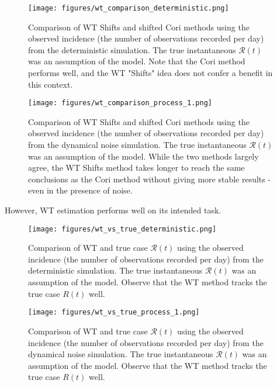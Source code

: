 \documentclass{article}
\newcommand{\nR}{\mathcal{R}}
\begin{document}
\begin{figure}[h!]
    \centering
    \texttt{[image: figures/wt\_comparison\_deterministic.png]}
    \caption{Comparison of WT Shifts and shifted Cori methods using the observed incidence (the number of observations recorded per day) from the deterministic simulation. The true instantaneous $\nR(t)$ was an assumption of the model. Note that the Cori method performs well, and the WT "Shifts" idea does not confer a benefit in this context.}
\end{figure}

\begin{figure}[h!]
    \centering
    \texttt{[image: figures/wt\_comparison\_process\_1.png]}
    \caption{Comparison of WT Shifts and shifted Cori methods using the observed incidence (the number of observations recorded per day) from the dynamical noise simulation. The true instantaneous $\nR(t)$ was an assumption of the model. While the two methods largely agree, the WT Shifts method takes longer to reach the same conclusions as the Cori method without giving more stable results - even in the presence of noise.}
\end{figure}

\clearpage
However, WT estimation performs well on its intended task.

\begin{figure}[h!]
    \centering
    \texttt{[image: figures/wt\_vs\_true\_deterministic.png]}
    \caption{Comparison of WT and true case $\nR(t)$ using the observed incidence (the number of observations recorded per day) from the deterministic simulation. The true instantaneous $\nR(t)$ was an assumption of the model. Observe that the WT method tracks the true case $R(t)$ well.}
    \label{fig:my_label}
\end{figure}

\begin{figure}[h!]
    \centering
    \texttt{[image: figures/wt\_vs\_true\_process\_1.png]}
    \caption{Comparison of WT and true case $\nR(t)$ using the observed incidence (the number of observations recorded per day) from the dynamical noise simulation. The true instantaneous $\nR(t)$ was an assumption of the model. Observe that the WT method tracks the true case $R(t)$ well.}
    \label{fig:my_label}
\end{figure}
\end{document}
